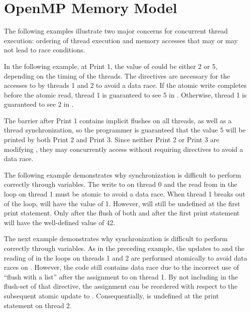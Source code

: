 
\section{OpenMP Memory Model}
\label{sec:mem_model}

The following examples illustrate two major concerns for concurrent thread
execution: ordering of thread execution and memory accesses that may or may not
lead to race conditions.

In the following example, at Print 1, the value of  could be either 2
or 5, depending on the timing of the threads. The  directives are
necessary for the accesses to  by threads 1 and 2 to avoid a data race.
If the atomic write completes before the atomic read, thread 1 is guaranteed to
see 5 in . Otherwise, thread 1 is guaranteed to see 2 in .

The barrier after Print 1 contains implicit flushes on all threads, as well as
a thread synchronization, so the programmer is guaranteed that the value 5 will
be printed by both Print 2 and Print 3. Since neither Print 2 or Print 3 are modifying
, they may concurrently access  without requiring 
directives to avoid a data race.



\pagebreak
{}
The following example demonstrates why synchronization is difficult to perform
correctly through variables. The write to  on thread 0 and the read
from  in the loop on thread 1 must be atomic to avoid a data race.
When thread 1 breaks out of the loop,  will have the value of 1.
However,  will still be undefined at the first print statement. Only
after the flush of both  and  after the first print
statement will  have the well-defined value of 42.



\pagebreak
{}
The next example demonstrates why synchronization is difficult to perform
correctly through variables. As in the preceding example, the updates to
 and the reading of  in the loops on threads 1 and 2 are
performed atomically to avoid data races on . However, the code still
contains data race due to the incorrect use of ``flush with a list'' after the
assignment to  on thread 1. By not including  in the
flush-set of that  directive, the assignment can be reordered with
respect to the subsequent atomic update to . Consequentially,
 is undefined at the print statement on thread 2.

